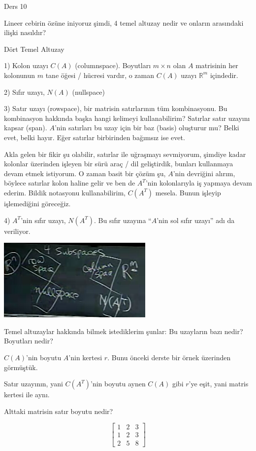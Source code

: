 \documentclass[12pt,fleqn]{article}\usepackage{../../common}
\begin{document}
Ders 10

Lineer cebirin özüne iniyoruz şimdi, 4 temel altuzay nedir ve onların
arasındaki ilişki nasıldır? 

Dört Temel Altuzay

1) Kolon uzayı $C(A)$ (columnspace). Boyutları $m \times n$ olan $A$
matrisinin her kolonunun $m$ tane öğesi / hücresi vardır, o zaman $C(A)$
uzayı $\mathbb{R}^m$ içindedir.

2) Sıfır uzayı, $N(A)$ (nullspace)

3) Satır uzayı (rowspace), bir matrisin satırlarının tüm kombinasyonu. Bu kombinasyon
hakkında başka hangi kelimeyi kullanabilirim? Satırlar satır uzayını kapsar
(span). $A$'nin satırları bu uzay için bir baz (basis) oluşturur mu? Belki
evet, belki hayır. Eğer satırlar birbirinden bağımsız ise evet. 

Akla gelen bir fikir şu olabilir, satırlar ile uğraşmayı sevmiyorum,
şimdiye kadar kolonlar üzerinden işleyen bir sürü araç / dil geliştirdik,
bunları kullanmaya devam etmek istiyorum. O zaman basit bir çözüm şu,
$A$'nin devriğini alırım, böylece satırlar kolon haline gelir ve ben de
$A^T$'nin kolonlarıyla iş yapmaya devam ederim. Bildik notasyonu
kullanabilirim, $C(A^T)$ mesela. Bunun işleyip işlemediğini göreceğiz.

4) $A^T$'nin sıfır uzayı, $N(A^T)$. Bu sıfır uzayına ``$A$'nin sol sıfır
uzayı'' adı da veriliyor.

\includegraphics[height=4cm]{10_01.png}

Temel altuzaylar hakkında bilmek istediklerim şunlar: Bu uzayların bazı
nedir? Boyutları nedir? 

$C(A)$'nin boyutu $A$'nin kertesi $r$. Bunu önceki derste bir örnek
üzerinden görmüştük. 

Satır uzayının, yani $C(A^T)$'nin boyutu aynen $C(A)$ gibi $r$'ye eşit, yani
matris kertesi ile aynı.

Alttaki matrisin satır boyutu nedir? 

$$ 
\left[\begin{array}{rrr}
1 & 2 & 3 \\
1 & 2 & 3 \\
2 & 5 & 8 
\end{array}\right]
 $$
\end{document}
